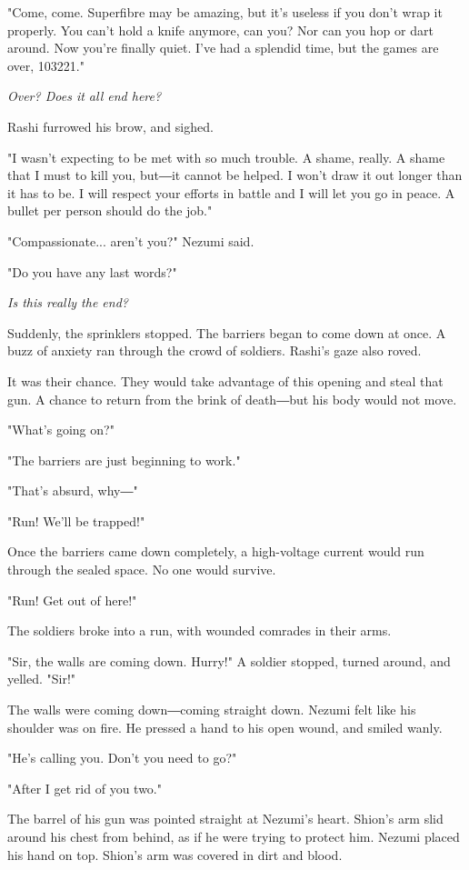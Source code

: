 "Come, come. Superfibre may be amazing, but it's useless if you don't
wrap it properly. You can't hold a knife anymore, can you? Nor can you
hop or dart around. Now you're finally quiet. I've had a splendid time,
but the games are over, 103221."

\emph{Over? Does it all end here?}

Rashi furrowed his brow, and sighed.

"I wasn't expecting to be met with so much trouble. A shame, really. A
shame that I must to kill you, but―it cannot be helped. I won't draw it
out longer than it has to be. I will respect your efforts in battle and
I will let you go in peace. A bullet per person should do the job."

"Compassionate... aren't you?" Nezumi said.

"Do you have any last words?"

\emph{Is this really the end?}

Suddenly, the sprinklers stopped. The barriers began to come down at
once. A buzz of anxiety ran through the crowd of soldiers. Rashi's gaze
also roved.

It was their chance. They would take advantage of this opening and steal
that gun. A chance to return from the brink of death―but his body would
not move.

"What's going on?"

"The barriers are just beginning to work."

"That's absurd, why―"

"Run! We'll be trapped!"

Once the barriers came down completely, a high-voltage current would run
through the sealed space. No one would survive.

"Run! Get out of here!"

The soldiers broke into a run, with wounded comrades in their arms.

"Sir, the walls are coming down. Hurry!" A soldier stopped, turned
around, and yelled. "Sir!"

The walls were coming down―coming straight down. Nezumi felt like his
shoulder was on fire. He pressed a hand to his open wound, and smiled
wanly.

"He's calling you. Don't you need to go?"

"After I get rid of you two."

The barrel of his gun was pointed straight at Nezumi's heart. Shion's
arm slid around his chest from behind, as if he were trying to protect
him. Nezumi placed his hand on top. Shion's arm was covered in dirt and
blood.


